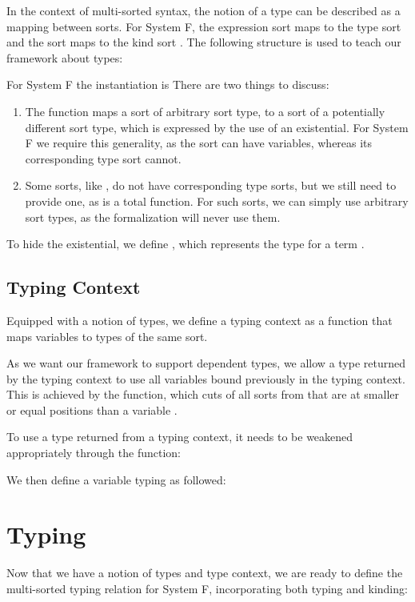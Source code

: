 \documentclass[a4paper, UKenglish, cleveref, autoref, thm-restate]{lipics-v2021}
\newenvironment{LibCode*}{%
  \begin{tcolorbox}[%
    colframe=white,%
    boxrule=0.0pt,%
    top=2.5pt,%
    left=2.5pt,%
    bottom=2.5pt,%
    right=2.5pt,%
    boxsep=0pt%
  ]\vspace{-0.2\baselineskip}%
}{%
  \vspace{-1\baselineskip}%
  \end{tcolorbox}%
}
\newcommand*\LibCode[1]{\begin{LibCode*}{#1}\end{LibCode*}}
\newcommand*\AppCode[1]{{#1}}
\newcommand*\ACode[1]{\AgdaFontStyle{\textcolor{mygray}{#1}}}
\newcommand*\AField[1]{\AgdaField{#1}}
\newcommand*\ACon[1]{\AgdaInductiveConstructor{#1}}
\newcommand*\ADef[1]{\AgdaFunction{#1}}
\begin{document}
  In the context of multi-sorted syntax, the notion of a type can be
  described as a mapping between sorts.
  For System F, the expression sort \ACode{\ACon{𝕖}} maps to the type sort
  \ACode{\ACon{𝕥}} and the sort \ACode{\ACon{𝕥}} maps to the kind sort
  \ACode{\ACon{𝕜}}.
  The following structure is used to teach our framework about types:
  \LibCode\KTypeSorts
  For System F the instantiation is
  \AppCode\FTypes
  There are two things to discuss:
  \begin{enumerate}
  \item
    The \ACode{\AField{↑ᵗ}} function maps a sort of arbitrary sort type,
    to a sort of a potentially different sort type, which is expressed
    by the use of an existential.
    For System F we require this generality, as the sort
    \ACode{\ACon{𝕥}} can have variables, whereas its corresponding type
    sort \ACode{\ACon{𝕜}} cannot.
  \item
    Some sorts, like \ACode{\ACon{𝕜}}, do not have corresponding type
    sorts, but we still need to provide one, as \ACode{\AField{↑ᵗ}} is a
    total function.
    For such sorts, we can simply use arbitrary sort types, as the
    formalization will never use them.
  \end{enumerate}
  To hide the existential, we define \ACode{S \ACon{∶⊢} s}, which represents
  the type for a term \ACode{S \ACon{⊢} s}.
  \LibCode\KTypes

  \subsection{Typing Context}
  Equipped with a notion of types, we define a typing context as a
  function that maps variables to types of the same sort.

  As we want our framework to support dependent types, we allow a type returned
  by the typing context to use all variables bound previously in the typing context.
  This is achieved by the \ACode{drop-∈} function, which cuts of all
  sorts from \ACode{S} that are at smaller or equal positions than a variable \ACode{x}.

  \LibCode\KContexts
  To use a type returned from a typing context, it needs to be
  weakened appropriately through the \ACode{\ADef{wk-telescope}} function:
  \LibCode\KContextLookup
  We then define a variable typing as followed:
  \LibCode\KVariableTyping

  \section{Typing}
  \label{sec:typing}
  Now that we have a notion of types and type context, we are ready to define
  the multi-sorted typing relation for System F, incorporating both
  typing and kinding:
  \AppCode\FTyping
\end{document}
